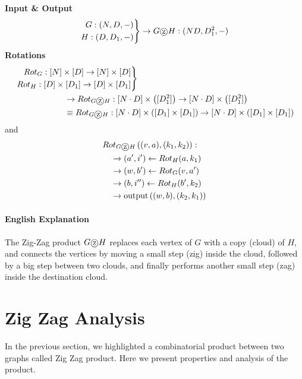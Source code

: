 \documentclass[11pt, letter]{book}
\newcommand*\tcircle[1]{%
  \raisebox{-0.5pt}{%
    \textcircled{#1}%
  }%
}
\begin{document}
\begin{definition}
	\textbf{Input \& Output}
	\begin{equation}
		\left. \begin{aligned}
 			G: (N, D, -) \\
 			H: (D, D_1, -) 
 		\end{aligned}\right\rbrace \rightarrow G \tcircle{z} H : (ND, D_1^2, -)
	\end{equation}
	\textbf{Rotations}
	\begin{align}
		&\left. \begin{aligned}
 			Rot_G: [N] \times [D] \rightarrow [N] \times [D] \\
 			Rot_H: [D] \times [D_1] \rightarrow [D] \times [D_1]
 		\end{aligned}\right \rbrace 
 		\\
 		&\quad \quad \quad \quad \quad \quad
 		\rightarrow Rot_{G\tcircle{z} H}: [N\cdot D] \times \left( [D_1^2] \right) \rightarrow [N\cdot D] \times \left( [D_1^2] \right)
 		\\
 		&\quad \quad \quad \quad \quad \quad
 		\equiv Rot_{G\tcircle{z} H}: [N\cdot D] \times \left( [D_1] \times [D_1] \right) \rightarrow [N\cdot D] \times \left( [D_1] \times [D_1] \right)
	\end{align}
	and 
	\begin{align}
		&Rot_{G \tcircle {z}  H} \left ( (v, a) , (k_1, k_2) \right) : \\
		&\quad \rightarrow (a', i') \gets Rot_H(a, k_1) \\
		&\quad \rightarrow (w, b') \gets Rot_G (v, a') \\
		&\quad \rightarrow (b, i'') \gets Rot_H (b', k_2) \\
		&\quad \rightarrow \text{output} \left( (w, b), (k_2, k_1) \right)
	\end{align}
	\paragraph{English Explanation} The Zig-Zag product $G \tcircle{z} H$ replaces each vertex of $G$ with a copy (cloud) of $H$, and connects the vertices by moving a small step (zig) inside the cloud, followed by a big step between two clouds, and finally performs another small step (zag) inside the destination cloud. 
\end{definition}

\section{Zig Zag Analysis}
In the previous section, we highlighted a combinatorial product between two graphs called Zig Zag product. Here we present properties and analysis of the product. 
\end{document}
